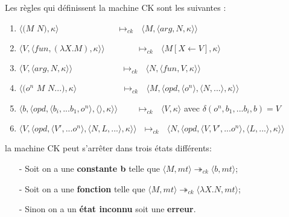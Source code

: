 \documentclass[10pt,a4paper]{report}
\begin{document}
	
	Les règles qui définissent la machine CK sont les suivantes :
	\begin{enumerate}
		\item $\langle(M$ $N),\kappa\rangle~~~~~~~~~~~~~~~~~~~~~~~~~~~~~~~\longmapsto_{ck}~~~\langle M,\langle arg,N,\kappa\rangle\rangle$
		\item $\langle V,\langle fun,(\lambda X.M),\kappa \rangle \rangle~~~~~~~~~~~~~~~~~\longmapsto_{ck}~~~\langle M[X \leftarrow V],\kappa\rangle$
		\item $\langle V,\langle arg,N,\kappa \rangle \rangle~~~~~~~~~~~~~~~~~~~~~~~~~~\longmapsto_{ck}~~~\langle N,\langle fun,V,\kappa \rangle \rangle$
		\item $\langle(o^{n}$ $M$ $N...),\kappa\rangle~~~~~~~~~~~~~~~~~~~~~~~~\longmapsto_{ck}~~~\langle M,\langle opd,\langle o^{n}\rangle,\langle N,...\rangle,\kappa\rangle\rangle$
		
		\item $\langle b,\langle opd,\langle b_{i},...b_{1},o^{n}\rangle,\langle\rangle,\kappa\rangle\rangle ~~~~~~~~~~\longmapsto_{ck}~~~\langle V,\kappa\rangle$ avec $\delta(o^{n},b_{1},...b_{i},b) = V$
		
		\item $\langle V,\langle opd,\langle V',...o^{n}\rangle,\langle N,L,...\rangle,\kappa\rangle\rangle ~~~\longmapsto_{ck}~~~\langle N,\langle opd,\langle V,V',...o^{n}\rangle,\langle L,...\rangle,\kappa\rangle\rangle$
	\end{enumerate}
	\bigbreak
	
	
	la machine CK peut s'arrêter dans trois états différents:
	\begin{itemize}
		\item[-] Soit on a une \textbf{constante b} telle que $\langle M,mt\rangle \twoheadrightarrow_{ck} \langle b,mt\rangle$;
		\item[-] Soit on a une \textbf{fonction} telle que $\langle M,mt\rangle \twoheadrightarrow_{ck} \langle\lambda X.N,mt\rangle$;
		\item[-] Sinon on a un \textbf{état inconnu} soit une \textbf{erreur}.
	\end{itemize}
	\bigbreak
	
\end{document}
